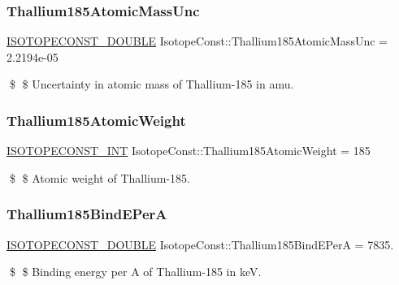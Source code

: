 \subsubsection{\texorpdfstring{Thallium185\+Atomic\+Mass\+Unc}{Thallium185AtomicMassUnc}}
{\footnotesize\ttfamily \mbox{\hyperlink{group___isotope_const-_macros_ga8f45a7272ce02c0b4c65c44636ed719a}{I\+S\+O\+T\+O\+P\+E\+C\+O\+N\+S\+T\+\_\+\+D\+O\+U\+B\+LE}} Isotope\+Const\+::\+Thallium185\+Atomic\+Mass\+Unc = 2.\+2194e-\/05}

\$ \$ Uncertainty in atomic mass of Thallium-\/185 in amu. \mbox{\label{group___isotope_const-_thallium-_tl185_gadfc4b5176fb15d0f3a785b2407799f92}} 
\subsubsection{\texorpdfstring{Thallium185\+Atomic\+Weight}{Thallium185AtomicWeight}}
{\footnotesize\ttfamily \mbox{\hyperlink{group___isotope_const-_macros_ga5f18360b3e99483a35c32d789e62621c}{I\+S\+O\+T\+O\+P\+E\+C\+O\+N\+S\+T\+\_\+\+I\+NT}} Isotope\+Const\+::\+Thallium185\+Atomic\+Weight = 185}

\$ \$ Atomic weight of Thallium-\/185. \mbox{\label{group___isotope_const-_thallium-_tl185_ga760803441eefcc62536a66a1279fb491}} 
\subsubsection{\texorpdfstring{Thallium185\+Bind\+E\+PerA}{Thallium185BindEPerA}}
{\footnotesize\ttfamily \mbox{\hyperlink{group___isotope_const-_macros_ga8f45a7272ce02c0b4c65c44636ed719a}{I\+S\+O\+T\+O\+P\+E\+C\+O\+N\+S\+T\+\_\+\+D\+O\+U\+B\+LE}} Isotope\+Const\+::\+Thallium185\+Bind\+E\+PerA = 7835.}

\$ \$ Binding energy per A of Thallium-\/185 in keV. \mbox{\label{group___isotope_const-_thallium-_tl185_gae40a290363f12dd4cfbf2cd004a1c385}} 
